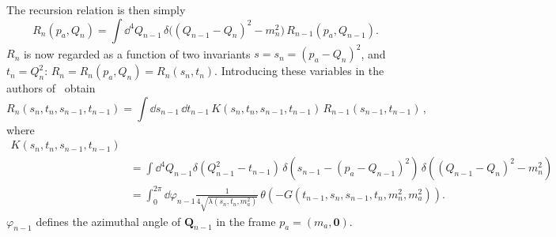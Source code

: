The recursion relation is then simply
\begin{equation}
    \label{eq:recursion-momentum-transfer}
    R_n(p_a, Q_n) = \int \dd^4 Q_{n-1} \,
        \delta
        \big(
            (Q_{n-1} - Q_n)^2 - m_n^2    
        \big) \, 
        R_{n-1}(p_a, Q_{n-1}) .
\end{equation}
$R_n$ is now regarded as a function of two invariants $s = s_n = (p_a - Q_n)^2$, and $t_n = Q_n^2$: $R_n = R_n(p_a, Q_n) = R_n(s_n, t_n)$. 
Introducing these variables in  the authors of~\cite{Byckling:1969sx} obtain
\begin{equation}
    R_n(s_n, t_n, s_{n-1}, t_{n-1}) = \int \dd s_{n-1} \, \dd t_{n-1} \, 
        K(s_n, t_n, s_{n-1}, t_{n-1}) \, R_{n-1}(s_{n-1}, t_{n-1}) \, ,
\end{equation}
where
\begin{align}
    K(s_n, t_n, s_{n-1}, t_{n-1}) &\\
    & = \int \dd^4 Q_{n-1} \delta(Q^2_{n-1} - t_{n-1}) \, \delta(s_{n-1} - (p_a - Q_{n-1})^2) \, \delta ( (Q_{n-1} - Q_n)^2 - m_n^2) \\
    & = \int_0^{2\pi} \dd \varphi_{n-1} 
        \frac{1}{4 \sqrt{\lambda(s_n, t_n, m_a^2)}} \, 
        \theta(- G(t_{n-1}, s_n, s_{n-1}, t_n, m_n^2, m_a^2)).
\end{align}
$\varphi_{n-1}$ defines the azimuthal angle of $\bm{Q}_{n-1}$ in the frame $p_a = (m_a, \bm{0})$.



